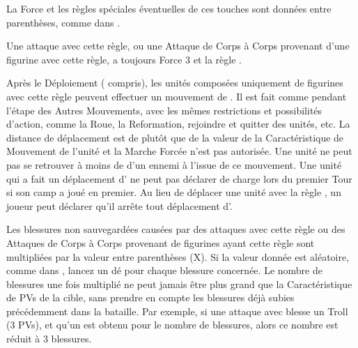  La Force et les règles spéciales éventuelles de ces touches sont données entre parenthèses, comme dans \og {} \fg{}.


Une attaque avec cette règle, ou une Attaque de Corps à Corps provenant d'une figurine avec cette règle, a toujours Force 3 et la règle .

\newpage
{}

Après le Déploiement (\scouts{} compris), les unités composées uniquement de figurines avec cette règle peuvent effectuer un mouvement de . Il est fait comme pendant l'étape des Autres Mouvements, avec les mêmes restrictions et possibilités d'action, comme la Roue, la Reformation, rejoindre et quitter des unités, etc. La distance de déplacement est de  plutôt que de la valeur de la Caractéristique de Mouvement de l'unité et la Marche Forcée n'est pas autorisée. Une unité ne peut pas se retrouver à moins de  d'un ennemi à l'issue de ce mouvement.  Une unité qui a fait un déplacement d'\vanguard{} ne peut pas déclarer de charge lors du premier Tour si son camp a joué en premier.  Au lieu de déplacer une unité avec la règle \vanguard{}, un joueur peut déclarer qu'il arrête tout déplacement d'\vanguard{}.


Les blessures non sauvegardées causées par des attaques avec cette règle ou des Attaques de Corps à Corps provenant de figurines ayant cette règle sont multipliées par la valeur entre parenthèses (X). Si la valeur donnée est aléatoire, comme dans \og {} \fg{}, lancez un dé pour chaque blessure concernée. Le nombre de blessures une fois multiplié ne peut jamais être plus grand que la Caractéristique de PVs de la cible, sans prendre en compte les blessures déjà subies précédemment dans la bataille. Par exemple, si une attaque avec  blesse un Troll (3 PVs), et qu'un  est obtenu pour le nombre de blessures, alors ce nombre est réduit à 3 blessures.

